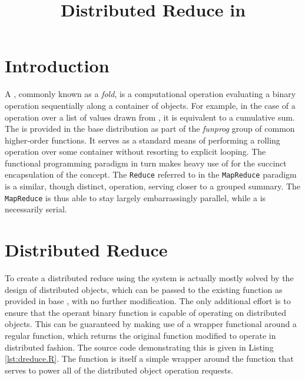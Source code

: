 \documentclass[10pt, a4paper]{article}
\begin{document}
\title{Distributed Reduce in \lsr{}}
  
\maketitle
\section{Introduction} %

A , commonly known as a \textit{fold}, is a computational operation evaluating a binary operation sequentially along a container of objects\cite{bird2010pearls}.
For example, in the case of a \hsrc{+} operation over a list of values drawn from \tbb, it is equivalent to a cumulative sum.
The  is provided in the base \R{} distribution as part of the \textit{funprog} group of common higher-order functions.
It serves as a standard means of performing a rolling operation over some container without resorting to explicit looping.
The functional programming paradigm in turn makes heavy use of  for the succinct encapsulation of the concept.
The \texttt{Reduce} referred to in the \texttt{MapReduce} paradigm is a similar, though distinct, operation, serving closer to a grouped summary\cite{dean2004mapreduce}.
The \texttt{MapReduce} is thus able to stay largely embarrassingly parallel, while a  is necessarily serial.

\section{Distributed Reduce}

To create a distributed reduce using the \lsr{} system is actually mostly solved by the design of distributed objects, which can be passed to the existing  function as provided in base \R{}, with no further modification.
The only additional effort is to ensure that the operant binary function is capable of operating on distributed objects.
This can be guaranteed by making use of a  wrapper functional around a regular function, which returns the original function modified to operate in distributed fashion. 
The source code demonstrating this is given in Listing \ref{lst:dreduce.R}.
The  function is itself a simple wrapper around the  function that serves to power all of the \lsr{} distributed object operation requests.
\end{document}
